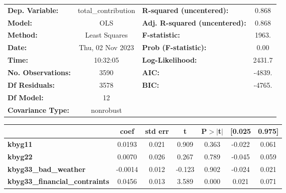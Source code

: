 \begin{center}
\begin{tabular}{lclc}
\toprule
\textbf{Dep. Variable:}                      & total\_contribution & \textbf{  R-squared (uncentered):}      &     0.868   \\
\textbf{Model:}                              &         OLS         & \textbf{  Adj. R-squared (uncentered):} &     0.868   \\
\textbf{Method:}                             &    Least Squares    & \textbf{  F-statistic:       }          &     1963.   \\
\textbf{Date:}                               &   Thu, 02 Nov 2023  & \textbf{  Prob (F-statistic):}          &     0.00    \\
\textbf{Time:}                               &       10:32:05      & \textbf{  Log-Likelihood:    }          &    2431.7   \\
\textbf{No. Observations:}                   &          3590       & \textbf{  AIC:               }          &    -4839.   \\
\textbf{Df Residuals:}                       &          3578       & \textbf{  BIC:               }          &    -4765.   \\
\textbf{Df Model:}                           &            12       & \textbf{                     }          &             \\
\textbf{Covariance Type:}                    &      nonrobust      & \textbf{                     }          &             \\
\bottomrule
\end{tabular}
\begin{tabular}{lcccccc}
                                             & \textbf{coef} & \textbf{std err} & \textbf{t} & \textbf{P$> |$t$|$} & \textbf{[0.025} & \textbf{0.975]}  \\
\midrule
\textbf{kbyg11}                              &       0.0193  &        0.021     &     0.909  &         0.363        &       -0.022    &        0.061     \\
\textbf{kbyg22}                              &       0.0070  &        0.026     &     0.267  &         0.789        &       -0.045    &        0.059     \\
\textbf{kbyg33\_bad\_weather}                &      -0.0014  &        0.012     &    -0.123  &         0.902        &       -0.024    &        0.021     \\
\textbf{kbyg33\_financial\_contraints}       &       0.0456  &        0.013     &     3.589  &         0.000        &        0.021    &        0.071     \\

\end{tabular}
\end{center}
